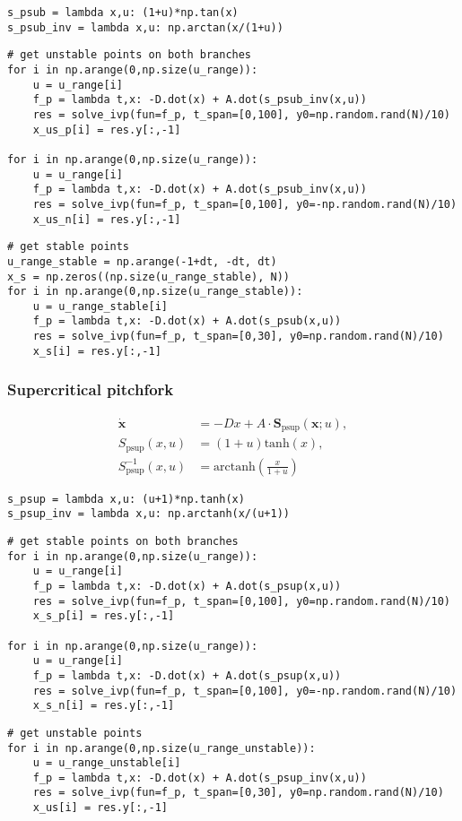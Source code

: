 \begin{verbatim}
s_psub = lambda x,u: (1+u)*np.tan(x)
s_psub_inv = lambda x,u: np.arctan(x/(1+u))
\end{verbatim}

\begin{verbatim}
# get unstable points on both branches
for i in np.arange(0,np.size(u_range)):
    u = u_range[i]
    f_p = lambda t,x: -D.dot(x) + A.dot(s_psub_inv(x,u))
    res = solve_ivp(fun=f_p, t_span=[0,100], y0=np.random.rand(N)/10)
    x_us_p[i] = res.y[:,-1]

for i in np.arange(0,np.size(u_range)):
    u = u_range[i]
    f_p = lambda t,x: -D.dot(x) + A.dot(s_psub_inv(x,u))
    res = solve_ivp(fun=f_p, t_span=[0,100], y0=-np.random.rand(N)/10)
    x_us_n[i] = res.y[:,-1]
\end{verbatim}

\begin{verbatim}
# get stable points
u_range_stable = np.arange(-1+dt, -dt, dt)
x_s = np.zeros((np.size(u_range_stable), N))
for i in np.arange(0,np.size(u_range_stable)):
    u = u_range_stable[i]
    f_p = lambda t,x: -D.dot(x) + A.dot(s_psub(x,u))
    res = solve_ivp(fun=f_p, t_span=[0,30], y0=np.random.rand(N)/10)
    x_s[i] = res.y[:,-1]
\end{verbatim}

\hypertarget{supercritical-pitchfork}{%
\subsubsection{Supercritical pitchfork}\label{supercritical-pitchfork}}

\begin{equation}
\begin{aligned}
\dot{\mathbf{x}} &= -Dx + A\cdot \mathbf{S}_\mathrm{psup}(\mathbf{x};u),\\
S_\mathrm{psup}(x,u) &= (1+u)\mathrm{tanh}(x),\\
S_\mathrm{psup}^{-1}(x,u) &= \mathrm{arctanh}(\frac{x}{1+u})
\end{aligned}
\end{equation}

\begin{verbatim}
s_psup = lambda x,u: (u+1)*np.tanh(x)
s_psup_inv = lambda x,u: np.arctanh(x/(u+1))
\end{verbatim}

\begin{verbatim}
# get stable points on both branches
for i in np.arange(0,np.size(u_range)):
    u = u_range[i]
    f_p = lambda t,x: -D.dot(x) + A.dot(s_psup(x,u))
    res = solve_ivp(fun=f_p, t_span=[0,100], y0=np.random.rand(N)/10)
    x_s_p[i] = res.y[:,-1]

for i in np.arange(0,np.size(u_range)):
    u = u_range[i]
    f_p = lambda t,x: -D.dot(x) + A.dot(s_psup(x,u))
    res = solve_ivp(fun=f_p, t_span=[0,100], y0=-np.random.rand(N)/10)
    x_s_n[i] = res.y[:,-1]
\end{verbatim}

\begin{verbatim}
# get unstable points
for i in np.arange(0,np.size(u_range_unstable)):
    u = u_range_unstable[i]
    f_p = lambda t,x: -D.dot(x) + A.dot(s_psup_inv(x,u))
    res = solve_ivp(fun=f_p, t_span=[0,30], y0=np.random.rand(N)/10)
    x_us[i] = res.y[:,-1]
\end{verbatim}

